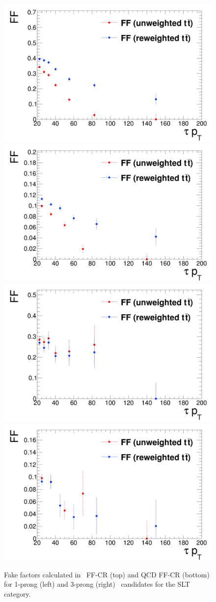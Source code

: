 \begin{figure}[htbp]
\centering
\includegraphics[width=.4\textwidth]{DiHiggs/plots/FF_CRs/SLTttbarCR1p.png}
\includegraphics[width=.4\textwidth]{DiHiggs/plots/FF_CRs/SLTttbarCR3p.png} \\
\includegraphics[width=.4\textwidth]{DiHiggs/plots/FF_CRs/SLTInvCR1p.png}
\includegraphics[width=.4\textwidth]{DiHiggs/plots/FF_CRs/SLTInvCR3p.png}\\
\caption{Fake factors 
calculated in \ttbar\ FF-CR (top) and QCD FF-CR (bottom)
for 1-prong (left) and 3-prong (right) 
\tauhad\ candidates for the SLT category.}
\label{fig:SLT_FF}
\end{figure}

